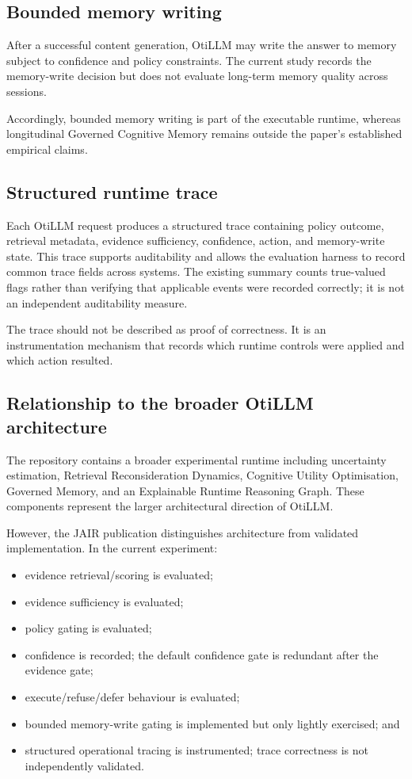 \documentclass[manuscript, screen, review]{jair}
\begin{document}
\subsection{Bounded memory writing}

After a successful content generation, OtiLLM may write the answer to memory
subject to confidence and policy constraints. The current study records the
memory-write decision but does not evaluate long-term memory quality across
sessions.

Accordingly, bounded memory writing is part of the executable runtime, whereas
longitudinal Governed Cognitive Memory remains outside the paper's established
empirical claims.

\subsection{Structured runtime trace}

Each OtiLLM request produces a structured trace containing policy outcome,
retrieval metadata, evidence sufficiency, confidence, action, and memory-write
state. This trace supports auditability and allows the evaluation harness to
record common trace fields across systems. The existing summary counts true-valued flags rather than verifying that applicable events were recorded correctly; it is not an independent auditability measure.

The trace should not be described as proof of correctness. It is an
instrumentation mechanism that records which runtime controls were applied and
which action resulted.

\subsection{Relationship to the broader OtiLLM architecture}

The repository contains a broader experimental runtime including uncertainty
estimation, Retrieval Reconsideration Dynamics, Cognitive Utility Optimisation,
Governed Memory, and an Explainable Runtime Reasoning Graph. These components
represent the larger architectural direction of OtiLLM.

However, the JAIR publication distinguishes architecture from validated
implementation. In the current experiment:

\begin{itemize}
\item evidence retrieval/scoring is evaluated;
\item evidence sufficiency is evaluated;
\item policy gating is evaluated;
\item confidence is recorded; the default confidence gate is redundant after the evidence gate;
\item execute/refuse/defer behaviour is evaluated;
\item bounded memory-write gating is implemented but only lightly exercised; and
\item structured operational tracing is instrumented; trace correctness is not independently validated.
\end{itemize}
\end{document}
